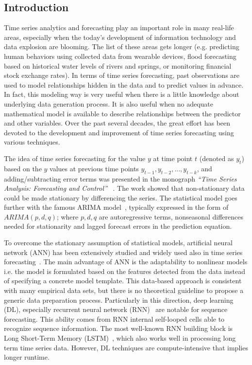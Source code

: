 \documentclass[11pt,twoside]{article}
\begin{document}
\vspace*{7pt}\textlineskip
\begin{multicols}{2}
\section{Introduction}
\label{intro}
Time series analytics and forecasting play an important role in many real-life areas, especially when the today's development of information technology and data explosion are blooming. The list of these areas gets longer (e.g. predicting human behaviors using collected data from wearable devices, flood forecasting based on historical water levels of rivers and springs, or monitoring financial stock exchange rates). In terms of time series forecasting, past observations are used to model relationships hidden in the data and to predict values in advance. In fact, this modeling way is very useful when there is a little knowledge about underlying data generation process. It is also useful when no adequate mathematical model is available to describe relationships between the predictor and other variables. Over the past several decades, the great effort has been devoted to the development and improvement of time series forecasting using various techniques.

The idea of time series forecasting for the value $y$ at time point $t$  (denoted as $y_t$) based on the $y$ values at previous time points $y_{t-1}, y_{t-2}, ..., y_{t-k}$, and adding/subtracting error terms was presented in the monograph \textit{``Time Series Analysis: Forecasting and Control''} ~\citep{box2015time}. The work showed that non-stationary data could be made stationary by differencing the series. The statistical model goes further with the famous ARIMA model~\citep{arima}, typically expressed in the form of $ARIMA(p, d, q)$; where $p, d, q$ are autoregressive terms, nonseasonal differences needed for stationarity and lagged forecast errors in the prediction equation.

To overcome the stationary assumption of statistical models, artificial neural network (ANN) has been extensively studied and widely used also in time series forecasting~\citep{ref_zhang2}. The main advantage of ANN is the adaptability to nonlinear models i.e. the model is formulated based on the features detected from the data instead of specifying a concrete model template. This data-based approach is consistent with many empirical data sets, but there is no theoretical guideline to propose a generic data preparation process. Particularly in this direction, deep learning (DL), especially recurrent neural network (RNN)~\citep{ref_rumelhart}  are notable for sequence forecasting. This ability comes from RNN internal self-looped cells able to recognize sequence information. The most well-known RNN building block is Long Short-Term Memory (LSTM)~\citep{ref_hochreiter}, which also works well in processing long term time series data.
However, DL techniques are compute-intensive that implies longer runtime.


\end{multicols}
\end{document}
